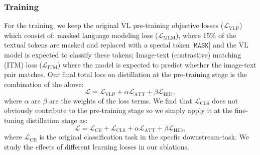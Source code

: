 \subsubsection{Training}
For the training, we keep the original VL pre-training objective losses ($\mathcal{L}_\text{VLP}$)~\cite{lu2019vilbert} which consist of: masked language  modeling loss ($\mathcal{L}_\text{MLM}$), where 15\% of the textual tokens are masked and replaced with a special token $\texttt{[MASK]}$ and the VL model is expected to classify these tokens; Image-text (contrastive) matching (ITM) loss ($\mathcal{L}_\text{ITM}$) where the model is expected to predict whether the image-text pair matches. Our final total loss on distillation at the pre-training stage is the combination of the above:
\begin{equation}
    \mathcal{L} = \mathcal{L}_\text{VLP} + \alpha\mathcal{L}_\text{ATT} + \beta\mathcal{L}_\text{HID},
\end{equation}
where $\alpha$ are $\beta$ are the weights of the loss terms. We find that $\mathcal{L}_\text{CLS}$ does not obviously contribute to the pre-training stage so we simply apply it at the fine-tuning distillation stage as:
\begin{equation}
    \mathcal{L} = \mathcal{L}_\text{CE} + \mathcal{L}_\text{CLS} + \alpha\mathcal{L}_\text{ATT} + \beta\mathcal{L}_\text{HID},
\end{equation}
where $\mathcal{L}_\text{CE}$ is the original classification task in the specfic downstream-task. We study the effects of different learning losses in our ablations.


